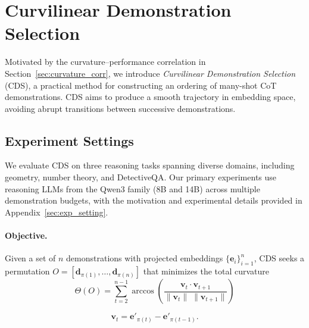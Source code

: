 \section{Curvilinear Demonstration Selection}
\label{sec:CDS}

Motivated by the curvature--performance correlation in Section~\ref{sec:curvature_corr}, we introduce \emph{Curvilinear Demonstration Selection} (CDS), a practical method for constructing an ordering of many-shot CoT demonstrations.
CDS aims to produce a smooth trajectory in embedding space, avoiding abrupt transitions between successive demonstrations.

\subsection{Experiment Settings}
We evaluate CDS on three reasoning tasks spanning diverse domains, including geometry, number theory, and DetectiveQA.
Our primary experiments use reasoning LLMs from the Qwen3 family (8B and 14B) across multiple demonstration budgets, with the motivation and experimental details provided in Appendix~\ref{sec:exp_setting}.


\paragraph{Objective.}
Given a set of $n$ demonstrations with projected embeddings $\{\mathbf{e}_i\}_{i=1}^n$, CDS seeks a permutation
$O=[\mathbf{d}_{\pi(1)},\ldots,\mathbf{d}_{\pi(n)}]$
that minimizes the total curvature
\begin{equation}
\Theta(O)=\sum_{t=2}^{n-1}\arccos\!\left(
\frac{\mathbf{v}_t \cdot \mathbf{v}_{t+1}}{\|\mathbf{v}_t\|\;\|\mathbf{v}_{t+1}\|}
\right)
\label{eq:CDS_curvature}
\end{equation}

\begin{equation}
    \mathbf{v}_t = \mathbf{e'}_{\pi(t)}-\mathbf{e'}_{\pi(t-1)}.
\end{equation}

